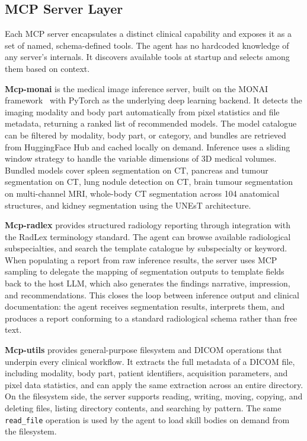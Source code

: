 \documentclass[conference]{IEEEtran}
\begin{document}
\subsection{MCP Server Layer}

Each MCP server encapsulates a distinct clinical capability and exposes
it as a set of named, schema-defined tools. The agent has no hardcoded
knowledge of any server's internals. It discovers available tools at
startup and selects among them based on context.

\textbf{Mcp-monai} is the medical image inference server, built on the
MONAI framework~\cite{monai} with PyTorch as the underlying deep
learning backend. It detects the imaging modality and body part
automatically from pixel statistics and file metadata, returning a
ranked list of recommended models. The model catalogue can be filtered
by modality, body part, or category, and bundles are retrieved from
HuggingFace Hub and cached locally on demand. Inference uses a sliding
window strategy to handle the variable dimensions of 3D medical volumes. Bundled models cover spleen segmentation on CT, pancreas and
tumour segmentation on CT, lung nodule detection on CT, brain tumour
segmentation on multi-channel MRI, whole-body CT segmentation across
104 anatomical structures, and kidney segmentation using the UNEsT
architecture.

\textbf{Mcp-radlex} provides structured radiology reporting through
integration with the RadLex terminology standard.
The agent can browse
available radiological subspecialties, and search the template catalogue by
subspecialty or keyword. When populating a report from raw inference
results, the server uses MCP sampling to delegate the mapping of
segmentation outputs to template fields back to the host LLM, which
also generates the findings narrative, impression, and recommendations.
This closes the loop between inference output and clinical
documentation: the agent receives segmentation results, interprets
them, and produces a report conforming to a standard radiological
schema rather than free text.

\textbf{Mcp-utils} provides general-purpose filesystem and DICOM
operations that underpin every clinical workflow. It extracts the full
metadata of a DICOM file, including modality, body part, patient
identifiers, acquisition parameters, and pixel data statistics, and can
apply the same extraction across an entire directory. On the filesystem side, the
server supports reading, writing, moving, copying, and deleting files,
listing directory contents, and searching by pattern. The same
\texttt{read\_file} operation is used by the agent to load skill bodies
on demand from the filesystem.
\end{document}

